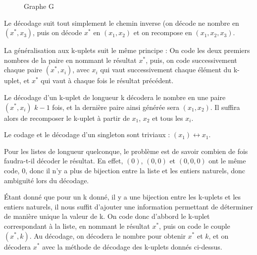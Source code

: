 \documentclass{article}
\begin{document}
\begin{figure}[h!]
  \centering
  \caption{Graphe G}
  \label{fig:codage-couple}
\end{figure}

Le décodage suit tout simplement le chemin inverse (on décode ne nombre en $(x^*, x_3)$, puis on décode $x^*$ en $(x_1, x_2)$ et on recompose en $(x_1, x_2, x_3)$.

La généralisation aux k-uplets suit le même principe : On code les deux premiers nombres de la paire en nommant le résultat $x^*$, puis, on
code successivement chaque paire $(x^*, x_i)$, avec $x_i$ qui vaut successivement chaque élément du k-uplet, et $x^*$ qui vaut à chaque fois
le résultat précédent.

Le décodage d'un k-uplet de longueur k décodera le nombre en une paire $(x^*, x_i)$ $k-1$ fois, et la dernière paire ainsi générée sera
$(x_1, x_2)$. Il suffira alors de recomposer le k-uplet à partir de $x_1$, $x_2$ et tous les $x_i$.

Le codage et le décodage d'un singleton sont triviaux : $(x_1) \leftrightarrow x_1$.

Pour les listes de longueur quelconque, le problème est de savoir combien de fois faudra-t-il décoder le résultat. En effet, $(0)$, $(0,0)$
et $(0,0,0)$ ont le même code, $0$, donc il n'y a plus de bijection entre la liste et les entiers naturels, donc ambiguïté lors du décodage.

Étant donné que pour un k donné, il y a une bijection entre les k-uplets et les entiers naturels, il nous suffit d'ajouter une information
permettant de déterminer de manière unique la valeur de k. On code donc d'abbord le k-uplet correspondant à la liste, en nommant le résultat
$x^*$, puis on code le couple $(x^*, k)$. Au décodage, on décodera le nombre pour obtenir $x^*$ et $k$, et on décodera $x^*$ avec la méthode
de décodage des k-uplets donnés ci-dessus.
\end{document}
